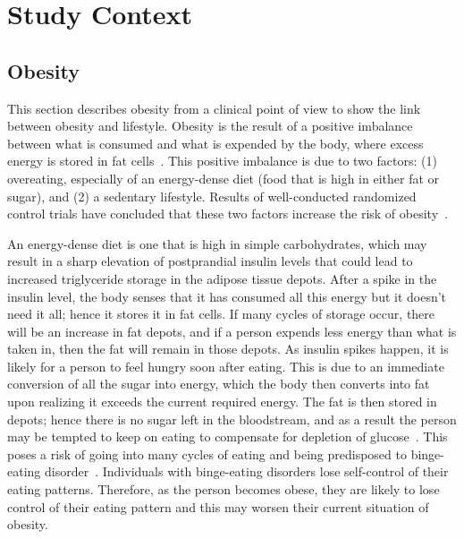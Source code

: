 
\chapter{Study Context} %

\label{contextchapter} %


\section{Obesity}
This section describes obesity from a clinical point of view to show the link between obesity and lifestyle. Obesity is the  result of a positive imbalance between what is consumed and what is expended by the body, where excess energy is stored in fat cells~\citep{steyn2006chronic}. This positive imbalance is due to two factors: (1) overeating, especially of an energy-dense diet (food that is high in either fat or sugar), and (2) a sedentary lifestyle. Results of well-conducted randomized control trials have concluded that these two factors increase the risk of obesity~\citep{swinburn2004diet}.

An energy-dense diet is one that is high in simple carbohydrates, which may result in a sharp elevation  of postprandial insulin levels that could lead to increased triglyceride storage in the adipose tissue depots. After a spike in the insulin level, the body senses that it has consumed all this energy but it doesn't need it all; hence it stores it in fat cells. If many cycles of storage occur, there will be an increase in fat depots, and if a person expends less energy than what is taken in, then the fat will remain in those depots. As insulin spikes happen, it is likely for a person to feel hungry soon after eating. This is due to an immediate conversion of all the sugar into energy, which the body then converts into fat upon realizing it exceeds the current required energy. The fat is then stored in depots; hence there is no sugar left in the bloodstream, and as a result the person may be tempted to keep on eating to compensate for depletion of glucose~\citep{bouchard1993exercise}. This poses a risk of going into many cycles of eating and being predisposed to binge-eating disorder~\citep{collins2009behavioral}. Individuals with binge-eating disorders lose self-control of their eating patterns. Therefore, as the person becomes obese, they are likely to lose control of their eating pattern and this may worsen their current situation of obesity. 

